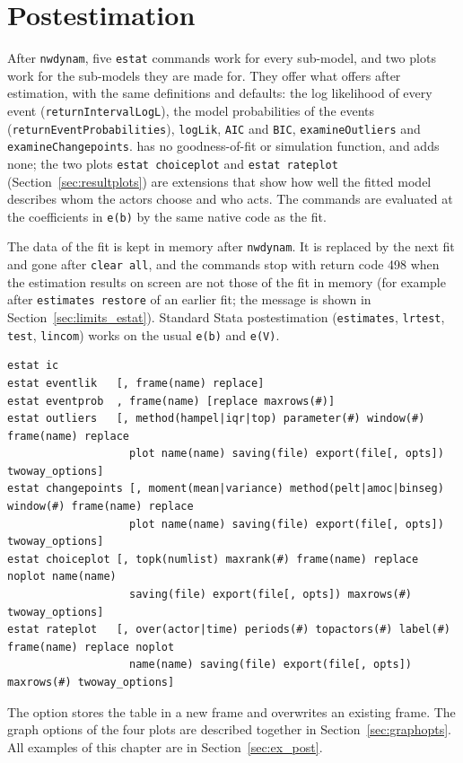 \chapter{Postestimation}\label{ch:postest}

After \texttt{nwdynam}, five \texttt{estat} commands work for every sub-model, and two plots work for the sub-models they are made for. They offer what \goldfish{} offers after estimation, with the same definitions and defaults: the log likelihood of every event (\texttt{returnIntervalLogL}), the model probabilities of the events (\texttt{returnEventProbabilities}), \texttt{logLik}, \texttt{AIC} and \texttt{BIC}, \texttt{examineOutliers} and \texttt{examineChangepoints}. \goldfish{} has no goodness-of-fit or simulation function, and \nwdynam{} adds none; the two plots \texttt{estat choiceplot} and \texttt{estat rateplot} (Section~\ref{sec:resultplots}) are extensions that show how well the fitted model describes whom the actors choose and who acts. The commands are evaluated at the coefficients in \texttt{e(b)} by the same native code as the fit.

The data of the fit is kept in memory after \texttt{nwdynam}. It is replaced by the next fit and gone after \texttt{clear all}, and the commands stop with return code 498 when the estimation results on screen are not those of the fit in memory (for example after \texttt{estimates restore} of an earlier fit; the message is shown in Section~\ref{sec:limits_estat}). Standard Stata postestimation (\texttt{estimates}, \texttt{lrtest}, \texttt{test}, \texttt{lincom}) works on the usual \texttt{e(b)} and \texttt{e(V)}.

\begin{lstlisting}
estat ic
estat eventlik   [, frame(name) replace]
estat eventprob  , frame(name) [replace maxrows(#)]
estat outliers   [, method(hampel|iqr|top) parameter(#) window(#) frame(name) replace
                   plot name(name) saving(file) export(file[, opts]) twoway_options]
estat changepoints [, moment(mean|variance) method(pelt|amoc|binseg) window(#) frame(name) replace
                   plot name(name) saving(file) export(file[, opts]) twoway_options]
estat choiceplot [, topk(numlist) maxrank(#) frame(name) replace noplot name(name)
                   saving(file) export(file[, opts]) maxrows(#) twoway_options]
estat rateplot   [, over(actor|time) periods(#) topactors(#) label(#) frame(name) replace noplot
                   name(name) saving(file) export(file[, opts]) maxrows(#) twoway_options]
\end{lstlisting}
The option  stores the table in a new frame and  overwrites an existing frame. The graph options of the four plots are described together in Section~\ref{sec:graphopts}. All examples of this chapter are in Section~\ref{sec:ex_post}.

